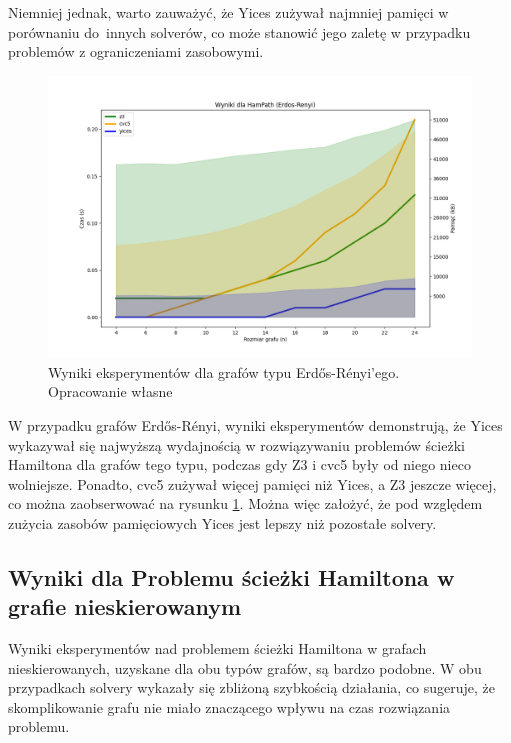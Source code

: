 Niemniej jednak, warto zauważyć, że Yices zużywał najmniej pamięci w porównaniu do~innych solverów, co może stanowić jego zaletę w przypadku problemów z ograniczeniami zasobowymi.

\begin{figure}[htbp]
	\centering
	\begin{minipage}{\textwidth}
		\includegraphics[width=\textwidth]{./figures/1-erdos-renyi-plot.png}
		\caption{Wyniki eksperymentów dla grafów typu  Erdős-Rényi'ego. Opracowanie własne}
		\label{fig:1-erdos-renyi-plot}
	\end{minipage}
\end{figure}

W przypadku grafów Erdős-Rényi, wyniki eksperymentów demonstrują, że Yices wykazywał się najwyższą wydajnością w rozwiązywaniu problemów ścieżki Hamiltona dla grafów tego typu, podczas gdy Z3 i cvc5 były od niego nieco wolniejsze. Ponadto, cvc5 zużywał więcej pamięci niż Yices, a Z3 jeszcze więcej, co można zaobserwować na rysunku \ref{fig:1-erdos-renyi-plot}. Można więc założyć, że pod względem zużycia zasobów pamięciowych Yices jest lepszy niż pozostałe solvery.

\subsection{Wyniki dla Problemu ścieżki Hamiltona w grafie nieskierowanym}

Wyniki eksperymentów nad problemem ścieżki Hamiltona w grafach nieskierowanych, uzyskane dla obu typów grafów, są bardzo podobne. W obu przypadkach solvery wykazały się zbliżoną szybkością działania, co sugeruje, że skomplikowanie grafu nie miało znaczącego wpływu na czas rozwiązania problemu.

